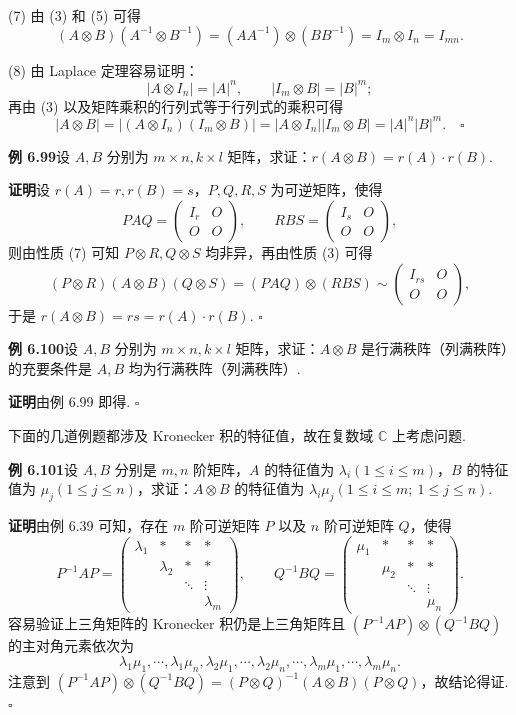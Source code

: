 \documentclass[UTF8,12pt,a4paper,fontset=fandol]{ctexart}
\begin{document}
(7) 由 (3) 和 (5) 可得
\[
(A\otimes B)(A^{-1}\otimes B^{-1})=(AA^{-1})\otimes(BB^{-1})=I_m\otimes I_n=I_{mn}.
\]

(8) 由 Laplace 定理容易证明：
\[
|A\otimes I_n|=|A|^n,\qquad |I_m\otimes B|=|B|^m;
\]
再由 (3) 以及矩阵乘积的行列式等于行列式的乘积可得
\[
|A\otimes B|=|(A\otimes I_n)(I_m\otimes B)|=|A\otimes I_n||I_m\otimes B|=|A|^n|B|^m. \quad \square
\]

\noindent\textbf{例 6.99}\quad 设 $A,B$ 分别为 $m\times n,k\times l$ 矩阵，求证：$r(A\otimes B)=r(A)\cdot r(B)$.

\noindent\textbf{证明}\quad 设 $r(A)=r,r(B)=s$，$P,Q,R,S$ 为可逆矩阵，使得
\[
PAQ=\begin{pmatrix} I_r&O\\ O&O\end{pmatrix},\qquad
RBS=\begin{pmatrix} I_s&O\\ O&O\end{pmatrix},
\]
则由性质 (7) 可知 $P\otimes R,Q\otimes S$ 均非异，再由性质 (3) 可得
\[
(P\otimes R)(A\otimes B)(Q\otimes S)=(PAQ)\otimes(RBS)\sim
\begin{pmatrix} I_{rs}&O\\ O&O\end{pmatrix},
\]
于是 $r(A\otimes B)=rs=r(A)\cdot r(B)$. $\square$

\noindent\textbf{例 6.100}\quad 设 $A,B$ 分别为 $m\times n,k\times l$ 矩阵，求证：$A\otimes B$ 是行满秩阵（列满秩阵）的充要条件是 $A,B$ 均为行满秩阵（列满秩阵）.

\noindent\textbf{证明}\quad 由例 6.99 即得. $\square$

下面的几道例题都涉及 Kronecker 积的特征值，故在复数域 $\mathbb{C}$ 上考虑问题.

\noindent\textbf{例 6.101}\quad 设 $A,B$ 分别是 $m,n$ 阶矩阵，$A$ 的特征值为 $\lambda_i(1\le i\le m)$，$B$ 的特征值为 $\mu_j(1\le j\le n)$，求证：$A\otimes B$ 的特征值为 $\lambda_i\mu_j(1\le i\le m;\ 1\le j\le n)$.

\noindent\textbf{证明}\quad 由例 6.39 可知，存在 $m$ 阶可逆矩阵 $P$ 以及 $n$ 阶可逆矩阵 $Q$，使得
\[
P^{-1}AP=
\begin{pmatrix}
\lambda_1&*&*&*\\
&\lambda_2&*&*\\
&&\ddots&\vdots\\
&&&\lambda_m
\end{pmatrix},\qquad
Q^{-1}BQ=
\begin{pmatrix}
\mu_1&*&*&*\\
&\mu_2&*&*\\
&&\ddots&\vdots\\
&&&\mu_n
\end{pmatrix}.
\]
容易验证上三角矩阵的 Kronecker 积仍是上三角矩阵且 $(P^{-1}AP)\otimes(Q^{-1}BQ)$ 的主对角元素依次为
\[
\lambda_1\mu_1,\cdots,\lambda_1\mu_n,\lambda_2\mu_1,\cdots,\lambda_2\mu_n,\cdots,\lambda_m\mu_1,\cdots,\lambda_m\mu_n.
\]
注意到 $(P^{-1}AP)\otimes(Q^{-1}BQ)=(P\otimes Q)^{-1}(A\otimes B)(P\otimes Q)$，故结论得证. $\square$
\end{document}
